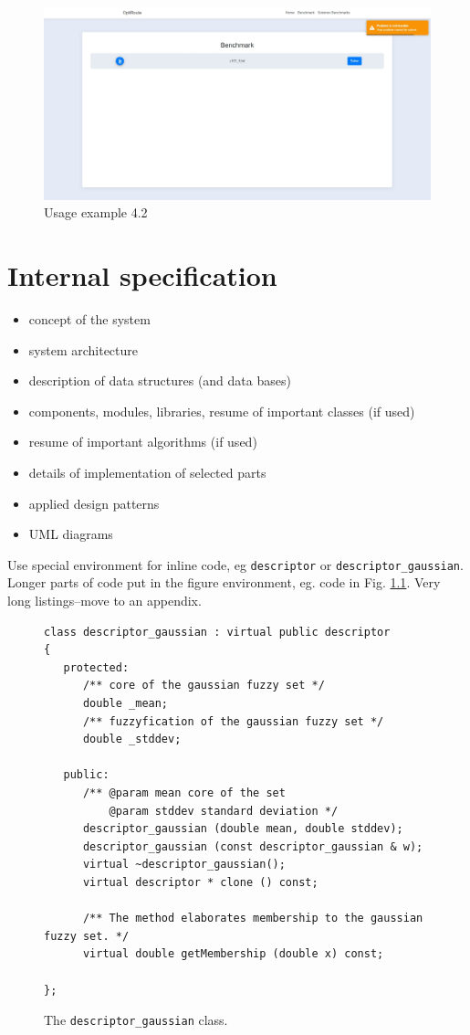\documentclass[a4paper,twoside,12pt]{book}
\begin{document}
\begin{figure}[H]
\centering
\includegraphics[scale=0.3]{images/benchmarkFailed.jpg}
\caption{Usage example 4.2}
\label{fig:benchmarkFailed}
\end{figure}


\chapter{Internal specification}

\begin{itemize}
\item concept of the system
\item system architecture
\item description of data structures (and data bases)
\item components, modules, libraries, resume of important classes (if used)
\item resume of important algorithms (if used)
\item details of implementation of selected parts
\item applied design patterns
\item UML diagrams
\end{itemize}


Use special environment for inline code, eg \lstinline|descriptor| or \lstinline|descriptor_gaussian|. 
Longer parts of code put in the figure environment, eg. code in Fig. \ref{fig:pseudokod}. Very long listings–move to an appendix.

\begin{figure}
\centering
\begin{lstlisting}
class descriptor_gaussian : virtual public descriptor
{
   protected:
      /** core of the gaussian fuzzy set */
      double _mean;
      /** fuzzyfication of the gaussian fuzzy set */
      double _stddev;
      
   public:
      /** @param mean core of the set
          @param stddev standard deviation */
      descriptor_gaussian (double mean, double stddev);
      descriptor_gaussian (const descriptor_gaussian & w);
      virtual ~descriptor_gaussian();
      virtual descriptor * clone () const;
      
      /** The method elaborates membership to the gaussian fuzzy set. */
      virtual double getMembership (double x) const;
     
};
\end{lstlisting}
\caption{The \lstinline|descriptor_gaussian| class.}
\label{fig:pseudokod}
\end{figure}
\end{document}

